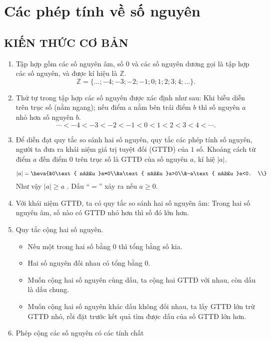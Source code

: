 
\section{Các phép tính về số nguyên}
\subsection{KIẾN THỨC CƠ BẢN}
	\begin{enumerate}
		\item Tập hợp gồm các số nguyên âm, số $0$ và các số nguyên dương gọi là tập hợp các số nguyên, và được kí hiệu là $\mathbb{Z}$.
	$$\mathbb{Z} = \{\ldots;-4;-3;-2;-1; 0; 1; 2; 3; 4;\ldots\}.$$
		\item Thứ tự trong tập hợp các số nguyên được xác định như sau: Khi biễu diễn trên trục số (nằm ngang); nếu điểm a nằm bên trái điểm $b$ thì số nguyên $a$ nhỏ hơn số nguyên $b$.
		 $$\cdots <-4<-3<-2<-1<0<1<2<3<4<\cdots .$$
		\item Để diễn đạt quy tắc so sánh hai số nguyên, quy tắc các phép tính số nguyên, người ta đưa ra khái niệm giá trị tuyệt đối (GTTĐ) của $1$ số.  Khoảng cách từ điểm $a$ đến điểm $0$ trên trục số là GTTĐ của số nguyên $a$, kí hiệ $|a|$.\\
			\begin{luuy}
				$$|a|=\heva{&0\text{ nếu }a=0\\&a\text{ nếu }a>0\\&-a\text{ nếu }a<0. \\}$$
				Như vậy $\left| a\right|\ge a$ . Dấu  “$=$”  xảy ra nếu $a\ge 0$.
			\end{luuy}
		\item Với khái niệm GTTĐ, ta có quy tắc so sánh hai số nguyên âm: Trong hai số nguyên âm, số nào có GTTĐ nhỏ hơn thì số đó lớn hơn.
		\item Quy tắc cộng hai số nguyên.
			\begin{itemize}
				\item Nếu một trong hai số bằng $0$ thì tổng bằng số kia.
				\item Hai số nguyên đối nhau có tổng bằng $0$.
				\item Muốn cộng hai số nguyên cùng dấu, ta cộng hai GTTĐ với nhau, còn dấu là dấu chung.
				\item Muốn cộng hai số nguyên khác dấu không đối nhau, ta lấy GTTĐ lớn trừ GTTĐ nhỏ, rồi đặt trước kết quả tìm được dấu của số GTTĐ lớn hơn.
			\end{itemize}
		\item Phép cộng các số nguyên có các tính chất

\end{enumerate}
